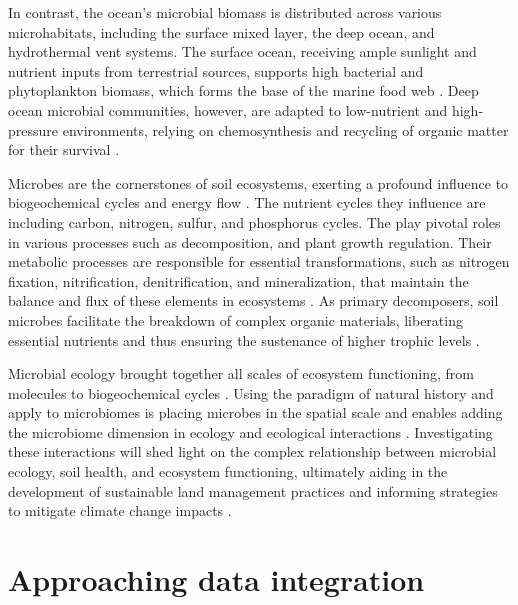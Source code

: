 In contrast, the ocean's microbial biomass is distributed across various
microhabitats, including the surface mixed layer, the deep ocean, and hydrothermal
vent systems. The surface ocean, receiving ample sunlight and nutrient inputs
from terrestrial sources, supports high bacterial and phytoplankton biomass,
which forms the base of the marine food web \parencite{Sunagawa2015}. Deep ocean
microbial communities, however, are adapted to low-nutrient and high-pressure
environments, relying on chemosynthesis and recycling of organic matter for their survival \parencite{christakis2018microbial}.

Microbes are the cornerstones of soil ecosystems, exerting a profound influence
to biogeochemical cycles and energy flow \parencite{graham2016Microbes}. The nutrient cycles they influence are
including carbon, nitrogen, sulfur, and phosphorus cycles.
The play pivotal roles in various processes such as decomposition,
and plant growth regulation.
Their metabolic processes are responsible for essential transformations, such as
nitrogen fixation, nitrification, denitrification, and mineralization, that
maintain the balance and flux of these elements in ecosystems \parencite{martiny2023Investigating}.
As primary decomposers, soil microbes facilitate the breakdown of complex
organic materials, liberating essential nutrients and thus ensuring the
sustenance of higher trophic levels \parencite{GRANDY201640}.

Microbial ecology brought together all scales of ecosystem functioning, from
molecules to biogeochemical cycles \parencite{hall2018understanding,kempes2012Growth,raes2011molecular}.
Using the paradigm of natural history and apply to microbiomes \parencite{Fierer2006} is placing microbes
in the spatial scale and enables adding the microbiome dimension in ecology and ecological interactions \parencite{Martiny2006}.
Investigating these
interactions will shed light on the complex relationship between microbial
ecology, soil health, and ecosystem functioning, ultimately aiding in the
development of sustainable land management practices and informing strategies to mitigate climate change impacts \parencite{cavicchioli2019scientists}.


\section{Approaching data integration}
\label{sec:integration}


